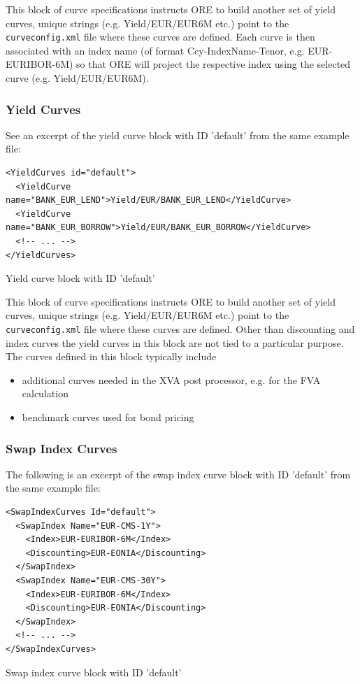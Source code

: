 \documentclass[12pt, a4paper]{article}
\begin{document}
This block of curve specifications instructs ORE to build another set of yield curves, unique strings
(e.g. Yield/EUR/EUR6M etc.) point to the {\tt curveconfig.xml} file where these curves are defined. Each curve is then
associated with an index name (of format Ccy-IndexName-Tenor, e.g. EUR-EURIBOR-6M) so that ORE will project the
respective index using the selected curve (e.g. Yield/EUR/EUR6M).

\subsubsection{Yield Curves}

See an excerpt of the yield curve block with ID 'default' from the same example file:

\begin{listing}[H]
\begin{verbatim}
<YieldCurves id="default">
  <YieldCurve name="BANK_EUR_LEND">Yield/EUR/BANK_EUR_LEND</YieldCurve>
  <YieldCurve name="BANK_EUR_BORROW">Yield/EUR/BANK_EUR_BORROW</YieldCurve>
  <!-- ... -->
</YieldCurves>
\end{verbatim}
\caption{Yield curve block with ID 'default'}
\label{lst:yieldcurve_spec}
\end{listing}

This block of curve specifications instructs ORE to build another set of yield curves, unique strings
(e.g. Yield/EUR/EUR6M etc.) point to the {\tt curveconfig.xml} file where these curves are defined. Other than
discounting and index curves the yield curves in this block are not tied to a particular purpose. The curves defined in
this block typically include

\begin{itemize}
\item additional curves needed in the XVA post processor, e.g. for the FVA calculation
\item benchmark curves used for bond pricing
\end{itemize}

\subsubsection{Swap Index Curves}

The following is an excerpt of the swap index curve block with ID 'default' from the same example file:

\begin{listing}[H]
\begin{verbatim}
<SwapIndexCurves Id="default">
  <SwapIndex Name="EUR-CMS-1Y">
    <Index>EUR-EURIBOR-6M</Index>
    <Discounting>EUR-EONIA</Discounting>
  </SwapIndex>
  <SwapIndex Name="EUR-CMS-30Y">
    <Index>EUR-EURIBOR-6M</Index>
    <Discounting>EUR-EONIA</Discounting>
  </SwapIndex>
  <!-- ... -->
</SwapIndexCurves>
\end{verbatim}
\caption{Swap index curve block with ID 'default'}
\label{lst:swapindexcurve_spec}
\end{listing}
\end{document}

